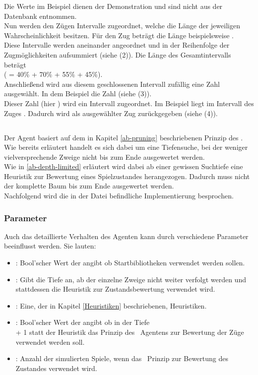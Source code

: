Die Werte im Beispiel dienen der Demonstration und sind nicht aus der Datenbank entnommen.
\\Nun werden den Zügen Intervalle zugeordnet, welche die Länge der jeweiligen Wahrscheinlichkeit besitzen. Für den Zug  beträgt die Länge beispielsweise . 
\\Diese Intervalle werden aneinander angeordnet und in der Reihenfolge der Zugmöglichkeiten aufsummiert (siehe (2)). Die Länge des Gesamtintervalls beträgt  \\( = 40\% + 70\% + 55\% + 45\%).
\\Anschließend wird aus diesem geschlossenen Intervall zufällig eine Zahl ausgewählt. In dem Beispiel die Zahl  (siehe (3)). 
\\Dieser Zahl (hier ) wird ein Intervall zugeordnet. Im Beispiel liegt  im Intervall des Zuges . Dadurch wird  als ausgewählter Zug zurückgegeben (siehe (4)).


\subsection{\abp}
Der Agent \mxZitat{\abp} basiert auf dem in Kapitel \ref{ab-pruning} beschriebenen Prinzip des \ababs. Wie bereits erläutert handelt es sich dabei um eine Tiefensuche, bei der weniger vielversprechende Zweige nicht bis zum Ende ausgewertet werden.
\\Wie in \ref{ab-depth-limited} erläutert wird dabei ab einer gewissen Suchtiefe eine Heuristik zur Bewertung eines Spielzustandes herangezogen. Dadurch muss nicht der komplette Baum bis zum Ende ausgewertet werden.  
\\Nachfolgend wird die in der Datei  befindliche Implementierung besprochen.
\subsubsection{Parameter}
Auch das detaillierte Verhalten des Agenten \mxZitat{\abp} kann durch verschiedene Parameter beeinflusst werden. Sie lauten:
\begin{itemize}
\item {}: Bool'scher Wert der angibt ob Startbibliotheken verwendet werden sollen.
\item {}: Gibt die Tiefe an, ab der einzelne Zweige nicht weiter verfolgt werden und stattdessen die Heuristik zur Zustandsbewertung verwendet wird.
\item {}: Eine, der in Kapitel \ref{Heuristiken} beschriebenen, Heuristiken.
\item {}: Bool'scher Wert der angibt ob in der Tiefe \\ + 1 statt der Heuristik das Prinzip des \mc\ Agentens zur Bewertung der Züge verwendet werden soll.
\item {}: Anzahl der simulierten Spiele, wenn das \mc\ Prinzip zur Bewertung des Zustandes verwendet wird.
\end{itemize}
